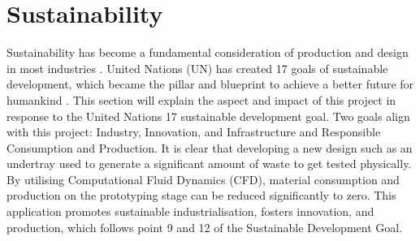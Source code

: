 \section{Sustainability}

\noindent Sustainability has become a fundamental consideration of production and design in most industries \cite{Gates2021HowDisaster}. United Nations (UN) has created 17 goals of sustainable development, which became the pillar and blueprint to achieve a better future for humankind \cite{UNITEDNATIONS}. This section will explain the aspect and impact of this project in response to the United Nations 17 sustainable development goal. Two goals align with this project: Industry, Innovation, and Infrastructure and Responsible Consumption and Production. It is clear that developing a new design such as an undertray used to generate a significant amount of waste to get tested physically. By utilising Computational Fluid Dynamics (CFD), material consumption and production on the prototyping stage can be reduced significantly to zero. This application promotes sustainable industrialisation, fosters innovation, and production, which follows point 9 and 12 of the Sustainable Development Goal.

